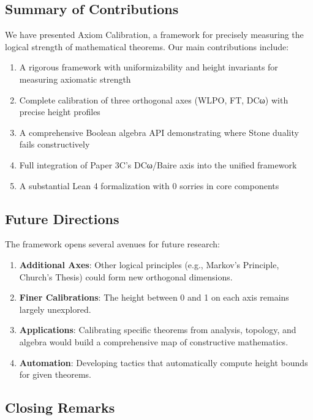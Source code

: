 \documentclass[11pt]{article}
\theoremstyle{plain}
\theoremstyle{definition}
\begin{document}
\subsection{Summary of Contributions}

We have presented Axiom Calibration, a framework for precisely measuring the logical strength of mathematical theorems. Our main contributions include:

\begin{enumerate}
\item A rigorous framework with uniformizability and height invariants for measuring axiomatic strength
\item Complete calibration of three orthogonal axes (WLPO, FT, DCω) with precise height profiles
\item A comprehensive Boolean algebra API demonstrating where Stone duality fails constructively
\item Full integration of Paper 3C's DCω/Baire axis into the unified framework
\item A substantial Lean 4 formalization with 0 sorries in core components
\end{enumerate}

\subsection{Future Directions}

The framework opens several avenues for future research:

\begin{enumerate}
\item \textbf{Additional Axes}: Other logical principles (e.g., Markov's Principle, Church's Thesis) could form new orthogonal dimensions.
\item \textbf{Finer Calibrations}: The height between 0 and 1 on each axis remains largely unexplored.
\item \textbf{Applications}: Calibrating specific theorems from analysis, topology, and algebra would build a comprehensive map of constructive mathematics.
\item \textbf{Automation}: Developing tactics that automatically compute height bounds for given theorems.
\end{enumerate}

\subsection{Closing Remarks}
\end{document}

